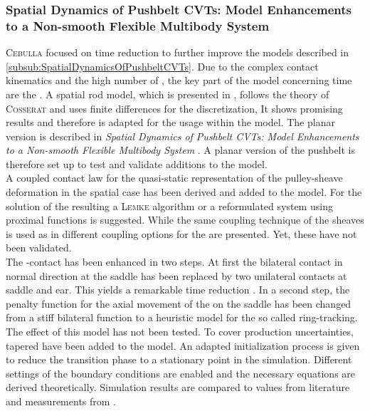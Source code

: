 \subsubsection{Spatial Dynamics of Pushbelt CVTs: Model Enhancements to a Non-smooth Flexible Multibody System}

\textsc{Cebulla} focused on \CPU time reduction to further improve the models described in \cref{subsub:SpatialDynamicsOfPushbeltCVTs}.
Due to the complex contact kinematics and the high number of \DOFs, the key part of the model concerning \CPU time are the \rings.
A spatial rod model, which is presented in \cite{lang_multi-body_2011}, follows the theory of \textsc{Cosserat} and uses finite differences for the discretization,
It shows promising results and therefore is adapted for the usage within the \CVT model.
The planar version is described in \emph{Spatial Dynamics of Pushbelt CVTs: Model Enhancements to a Non-smooth Flexible Multibody System} \cite{cebulla_spatial_2014}.
A planar version of the pushbelt \CVT is therefore set up to test and validate additions to the model.\\
A coupled contact law for the quasi-static representation of the pulley-sheave deformation in the spatial case has been derived and added to the model. 
For the solution of the resulting \LCP a \textsc{Lemke} algorithm or a reformulated system using proximal functions is suggested.
While the same coupling technique of the sheaves is used as in \cite{geier_dynamics_2007} different coupling options for the \els are presented.
Yet, these have not been validated.\\
The \el-\ring contact has been enhanced in two steps.
At first the bilateral contact in normal direction at the \el saddle has been replaced by two unilateral contacts at saddle and ear.
This yields a remarkable \CPU time reduction \cite[p.129]{cebulla_spatial_2014}.
In a second step, the penalty function for the axial movement of the \rings on the saddle has been changed from a stiff bilateral function to a heuristic model for the so called ring-tracking.
The effect of this model has not been tested.
To cover production uncertainties, tapered \els have been added to the model. 
An adapted initialization process is given to reduce the transition phase to a stationary point in the simulation.
Different settings of the boundary conditions are enabled and the necessary equations are derived theoretically.
Simulation results are compared to values from literature and measurements from \Bosch.
\par

